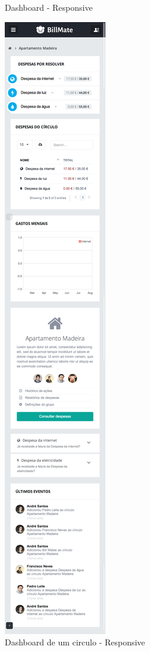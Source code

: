 \begin{referenciaswww}
\begin{figure}[ht]
{\caption{Dashboard - Responsive}
}
{
\includegraphics[width=.5\textwidth]{images/andre/circler}
\caption{Dashboard de um circulo - Responsive }
}
\end{figure}


\end{referenciaswww}
